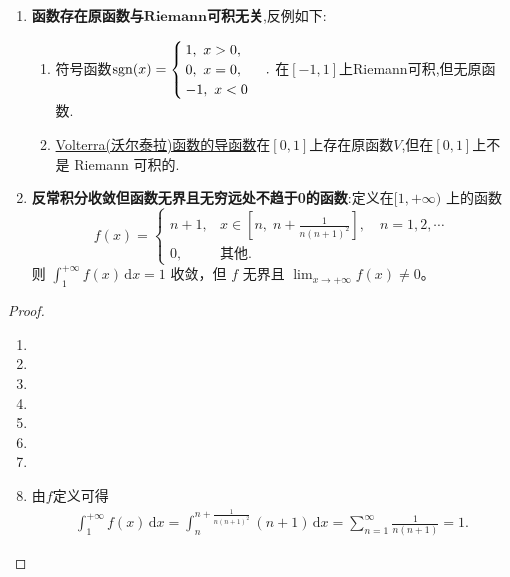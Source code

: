 \documentclass[../../main.tex]{subfiles}%
\begin{document}
\begin{proposition}[常见反例]
\begin{enumerate}
\item \textbf{函数存在原函数与}$\mathbf{Riemann}$\textbf{可积无关},反例如下:
\begin{enumerate}[(1)]
\item 符号函数$\operatorname{sgn}(x)=
\begin{cases}
1,\ x>0,\\
0,\ x=0,\\
-1,\ x<0
\end{cases}.$
在$[-1,1]$上Riemann可积,但无原函数.

\item \hyperref[Real Analysis-theorem:Volterra函数的基本性质]{Volterra(沃尔泰拉)函数的导函数}在$[0,1]$上存在原函数$V$,但在$[0,1]$上不是 Riemann 可积的.
\end{enumerate}

\item \textbf{反常积分收敛但函数无界且无穷远处不趋于0的函数}:定义在\([1,+\infty)\) 上的函数
\[
f(x)=\begin{cases}
n+1, & x\in\left[n,\; n+\frac{1}{n(n+1)^2}\right],\quad n=1,2,\cdots\\
0, & \text{其他}.
\end{cases}
\]
则 \(\int_1^{+\infty}f(x)\,\mathrm{d}x=1\) 收敛，但 \(f\) 无界且 \(\lim_{x\to+\infty}f(x)\neq0\)。
\end{enumerate}
\end{proposition}
\begin{proof}
\begin{enumerate}
\item 

\item 

\item 

\item 

\item 

\item 

\item 

\item 由$f$定义可得
\begin{align*}
\int_1^{+\infty}f(x)\,\mathrm{d}x=\int_{n}^{n+\frac{1}{n(n+1)^2}}(n+1)\,\mathrm{d}x=\sum_{n=1}^{\infty}\frac{1}{n(n+1)}=1.
\end{align*}
\end{enumerate}
\end{proof}
\end{document}
